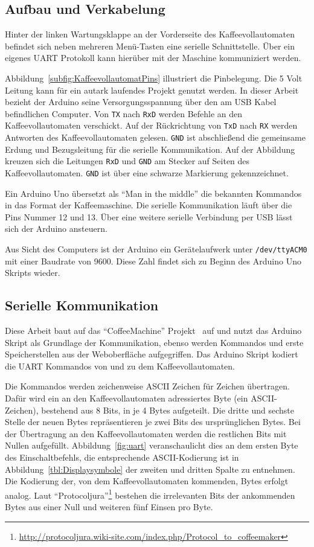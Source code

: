 \subsection{Aufbau und Verkabelung}\label{subsec:AufbauUndVerkabelung}
Hinter der linken Wartungsklappe an der Vorderseite des Kaffeevollautomaten befindet sich neben mehreren Menü-Tasten eine serielle Schnittstelle.
Über ein eigenes \ac{UART} Protokoll kann hierüber mit der Maschine kommuniziert werden.

Abbildung~\ref{subfig:KaffeevollautomatPins} illustriert die Pinbelegung.
Die 5 Volt Leitung kann für ein autark laufendes Projekt genutzt werden.
In dieser Arbeit bezieht der Arduino seine Versorgungsspannung über den am USB Kabel befindlichen Computer.
Von \texttt{TX} nach \texttt{RxD} werden Befehle an den Kaffeevollautomaten verschickt.
Auf der Rückrichtung von \texttt{TxD} nach \texttt{RX} werden Antworten des Kaffeevollautomaten gelesen.
\texttt{GND} ist abschließend die gemeinsame Erdung und Bezugsleitung für die serielle Kommunikation.
Auf der Abbildung kreuzen sich die Leitungen \texttt{RxD} und \texttt{GND} am Stecker auf Seiten des Kaffeevollautomaten.
\texttt{GND} ist über eine schwarze Markierung gekennzeichnet.

Ein Arduino Uno übersetzt als "`Man in the middle"' die bekannten Kommandos in das Format der Kaffeemaschine.
Die serielle Kommunikation läuft über die Pins Nummer 12 und 13.
Über eine weitere serielle Verbindung per USB lässt sich der Arduino ansteuern.

Aus Sicht des Computers ist der Arduino ein Gerätelaufwerk unter \texttt{/dev/ttyACM0} mit einer Baudrate von 9600.
Diese Zahl findet sich zu Beginn des Arduino Uno Skripts wieder.

\subsection{Serielle Kommunikation}
Diese Arbeit baut auf das "`CoffeeMachine"' Projekt~\cite{GitCoffeeMachine} auf und nutzt das Arduino Skript als Grundlage der Kommunikation, ebenso werden Kommandos und erste Speicherstellen aus der Weboberfläche aufgegriffen.
Das Arduino Skript kodiert die \ac{UART} Kommandos von und zu dem Kaffeevollautomaten.

Die Kommandos werden zeichenweise \acs{ASCII} Zeichen für Zeichen übertragen.
Dafür wird ein an den Kaffeevollautomaten adressiertes Byte (ein \acs{ASCII}-Zeichen), bestehend aus 8 Bits, in je 4 Bytes aufgeteilt.
Die dritte und sechste Stelle der neuen Bytes repräsentieren je zwei Bits des ursprünglichen Bytes.
Bei der Übertragung an den Kaffeevollautomaten werden die restlichen Bits mit Nullen aufgefüllt.
Abbildung~\ref{fig:uart} veranschaulicht dies an dem ersten Byte des Einschaltbefehls, die entsprechende \ac{ASCII}-Kodierung ist in Abbildung~\ref{tbl:Displaysymbole} der zweiten und dritten Spalte zu entnehmen.
Die Kodierung der, von dem Kaffeevollautomaten kommenden, Bytes erfolgt analog.
Laut "`Protocoljura"'\footnote{\url{http://protocoljura.wiki-site.com/index.php/Protocol_to_coffeemaker}} bestehen die irrelevanten Bits der ankommenden Bytes aus einer Null und weiteren fünf Einsen pro Byte.

